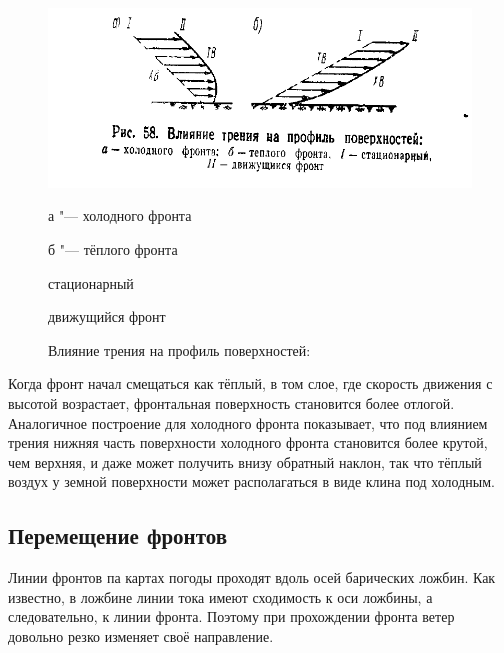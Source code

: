 \documentclass[a4paper, 12pt, twoside, draft, book, russian, fittopage, cyremdash, openright]{ncc}
\begin{document}
\begin{figure}[htb]
   \centering
   \includegraphics[scale=1]{12_friction_surface_profile.pdf}
   \caption[Влияние трения на профиль поверхностей]{Влияние трения на профиль поверхностей:}
   \label{fig:firction_sufrace_profile}
   \small
   \begin{enumerate*}[itemjoin={{; }}, label={}, after={{; }}]
   \item а "--- холодного фронта
   \item б "--- тёплого фронта
   \end{enumerate*}
   \begin{enumerate*}[itemjoin={{; }}, label={\Roman* "--- }]
   \item стационарный
   \item движущийся фронт
   \end{enumerate*}
\end{figure}

Когда фронт начал смещаться как тёплый, в том слое, где скорость
движения с высотой возрастает, фронтальная поверхность становится
более отлогой. Аналогичное построение для холодного фронта показывает,
что под влиянием трения нижняя часть поверхности холодного фронта
становится более крутой, чем верхняя, и даже может получить внизу
обратный наклон, так что тёплый воздух у земной поверхности может
располагаться в виде клина под холодным.

\subsection{Перемещение фронтов}
\label{sec:fronts_moving}

Линии фронтов па картах погоды проходят вдоль осей барических
ложбин. Как известно, в ложбине линии тока имеют сходимость к оси
ложбины, а следовательно, к линии фронта. Поэтому при прохождении
фронта ветер довольно резко изменяет своё направление.
\end{document}
